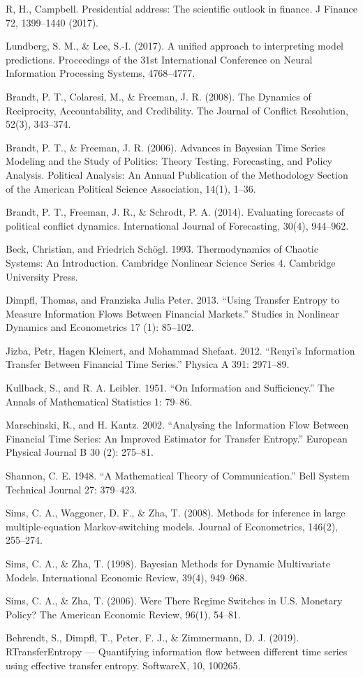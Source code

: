 \documentclass[
]{article}
\begin{document}
R, H., Campbell. Presidential address: The scientific outlook in
finance. J Finance 72, 1399--1440 (2017).

Lundberg, S. M., \& Lee, S.-I. (2017). A unified approach to
interpreting model predictions. Proceedings of the 31st International
Conference on Neural Information Processing Systems, 4768--4777.

Brandt, P. T., Colaresi, M., \& Freeman, J. R. (2008). The Dynamics of
Reciprocity, Accountability, and Credibility. The Journal of Conflict
Resolution, 52(3), 343--374.

Brandt, P. T., \& Freeman, J. R. (2006). Advances in Bayesian Time
Series Modeling and the Study of Politics: Theory Testing, Forecasting,
and Policy Analysis. Political Analysis: An Annual Publication of the
Methodology Section of the American Political Science Association,
14(1), 1--36.

Brandt, P. T., Freeman, J. R., \& Schrodt, P. A. (2014). Evaluating
forecasts of political conflict dynamics. International Journal of
Forecasting, 30(4), 944--962.

Beck, Christian, and Friedrich Schögl. 1993. Thermodynamics of Chaotic
Systems: An Introduction. Cambridge Nonlinear Science Series 4.
Cambridge University Press.

Dimpfl, Thomas, and Franziska Julia Peter. 2013. ``Using Transfer
Entropy to Measure Information Flows Between Financial Markets.''
Studies in Nonlinear Dynamics and Econometrics 17 (1): 85--102.

Jizba, Petr, Hagen Kleinert, and Mohammad Shefaat. 2012. ``Renyi's
Information Transfer Between Financial Time Series.'' Physica A 391:
2971--89.

Kullback, S., and R. A. Leibler. 1951. ``On Information and
Sufficiency.'' The Annals of Mathematical Statistics 1: 79--86.

Marschinski, R., and H. Kantz. 2002. ``Analysing the Information Flow
Between Financial Time Series: An Improved Estimator for Transfer
Entropy.'' European Physical Journal B 30 (2): 275--81.

Shannon, C. E. 1948. ``A Mathematical Theory of Communication.'' Bell
System Technical Journal 27: 379--423.

Sims, C. A., Waggoner, D. F., \& Zha, T. (2008). Methods for inference
in large multiple-equation Markov-switching models. Journal of
Econometrics, 146(2), 255--274.

Sims, C. A., \& Zha, T. (1998). Bayesian Methods for Dynamic
Multivariate Models. International Economic Review, 39(4), 949--968.

Sims, C. A., \& Zha, T. (2006). Were There Regime Switches in U.S.
Monetary Policy? The American Economic Review, 96(1), 54--81.

Behrendt, S., Dimpfl, T., Peter, F. J., \& Zimmermann, D. J. (2019).
RTransferEntropy --- Quantifying information flow between different time
series using effective transfer entropy. SoftwareX, 10, 100265.
\end{document}
